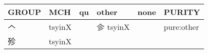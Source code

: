 \documentclass[14pt,a4paper]{scrartcl}
\begin{document}
\begin{longtable}[c]{@{}llllll@{}}
\toprule
\begin{minipage}[b]{0.14\columnwidth}\raggedright\strut
GROUP
\strut\end{minipage} &
\begin{minipage}[b]{0.14\columnwidth}\raggedright\strut
MCH
\strut\end{minipage} &
\begin{minipage}[b]{0.14\columnwidth}\raggedright\strut
qu
\strut\end{minipage} &
\begin{minipage}[b]{0.14\columnwidth}\raggedright\strut
other
\strut\end{minipage} &
\begin{minipage}[b]{0.14\columnwidth}\raggedright\strut
none
\strut\end{minipage} &
\begin{minipage}[b]{0.14\columnwidth}\raggedright\strut
PURITY
\strut\end{minipage}\tabularnewline
\midrule
\endhead
\begin{minipage}[t]{0.14\columnwidth}\raggedright\strut
𠆢
\strut\end{minipage} &
\begin{minipage}[t]{0.14\columnwidth}\raggedright\strut
tsyinX
\strut\end{minipage} &
\begin{minipage}[t]{0.14\columnwidth}\raggedright\strut
\strut\end{minipage} &
\begin{minipage}[t]{0.14\columnwidth}\raggedright\strut
㐱 tsyinX
\strut\end{minipage} &
\begin{minipage}[t]{0.14\columnwidth}\raggedright\strut
\strut\end{minipage} &
\begin{minipage}[t]{0.14\columnwidth}\raggedright\strut
pure:other
\strut\end{minipage}\tabularnewline
\begin{minipage}[t]{0.14\columnwidth}\raggedright\strut
殄
\strut\end{minipage} &
\begin{minipage}[t]{0.14\columnwidth}\raggedright\strut
tsyinX
\strut\end{minipage} &
\begin{minipage}[t]{0.14\columnwidth}\raggedright\strut
\strut\end{minipage} &
\begin{minipage}[t]{0.14\columnwidth}\raggedright\strut

\end{minipage}
\end{longtable}
\end{document}
